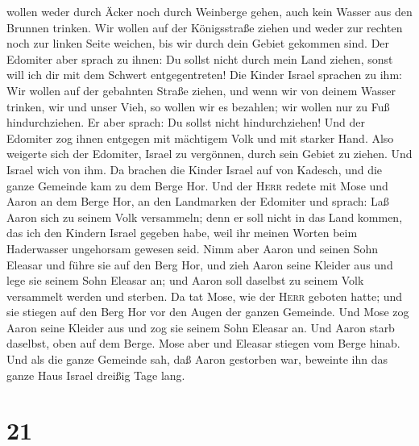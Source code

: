 wollen weder durch Äcker noch durch Weinberge gehen, auch kein Wasser
aus den Brunnen trinken. Wir wollen auf der Königsstraße ziehen und
weder zur rechten noch zur linken Seite weichen, bis wir durch dein
Gebiet gekommen sind.  Der Edomiter aber sprach zu ihnen:
Du sollst nicht durch mein Land ziehen, sonst will ich dir mit dem
Schwert entgegentreten!  Die Kinder Israel sprachen zu
ihm: Wir wollen auf der gebahnten Straße ziehen, und wenn wir von deinem
Wasser trinken, wir und unser Vieh, so wollen wir es bezahlen; wir
wollen nur zu Fuß hindurchziehen.  Er aber sprach: Du
sollst nicht hindurchziehen! Und der Edomiter zog ihnen entgegen mit
mächtigem Volk und mit starker Hand.  Also weigerte sich
der Edomiter, Israel zu vergönnen, durch sein Gebiet zu ziehen. Und
Israel wich von ihm.  Da brachen die Kinder Israel auf
von Kadesch, und die ganze Gemeinde kam zu dem Berge Hor.
 Und der \textsc{Herr} redete mit Mose und Aaron an dem
Berge Hor, an den Landmarken der Edomiter und sprach: 
Laß Aaron sich zu seinem Volk versammeln; denn er soll nicht in das Land
kommen, das ich den Kindern Israel gegeben habe, weil ihr meinen Worten
beim Haderwasser ungehorsam gewesen seid.  Nimm aber
Aaron und seinen Sohn Eleasar und führe sie auf den Berg Hor,
 und zieh Aaron seine Kleider aus und lege sie seinem
Sohn Eleasar an; und Aaron soll daselbst zu seinem Volk versammelt
werden und sterben.  Da tat Mose, wie der \textsc{Herr}
geboten hatte; und sie stiegen auf den Berg Hor vor den Augen der ganzen
Gemeinde.  Und Mose zog Aaron seine Kleider aus und zog
sie seinem Sohn Eleasar an. Und Aaron starb daselbst, oben auf dem
Berge. Mose aber und Eleasar stiegen vom Berge hinab. 
Und als die ganze Gemeinde sah, daß Aaron gestorben war, beweinte ihn
das ganze Haus Israel dreißig Tage lang.

\hypertarget{section-20}{%
\section{21}\label{section-20}}

